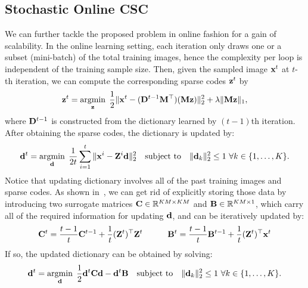 \subsection{Stochastic Online CSC}
We can further tackle the proposed problem in online fashion for a gain of scalability. In the online learning setting, each iteration only draws one or a subset (mini-batch) of the total training images, hence the complexity per loop is independent of the training sample size. Then, given the sampled image $\signal^t$ at $t$-th iteration, we can compute the corresponding sparse codes $\code^t$ by
\begin{equation} \label{eq:updatingCodeOnline}
    \code^t = \minimize{\code} \frac{1}{2}\|\signal^t - (\Filter^{t-1} \mask^\top)(\mask \code) \|_2^2 + \lambda \|\mask \code\|_1,
\end{equation}
where $\Filter^{t-1}$ is constructed from the dictionary learned by $(t-1)$th iteration. After obtaining the sparse codes, the dictionary is updated by:
\begin{equation}
    \filter^t = \minimize{\filter} \frac{1}{2t}\sum_{i=1}^{t} \|\signal^i - \Code^i \filter \|_2^2 \quad \text{subject to} \quad \|\filter_k\|^2_2 \leq 1 ~ \forall k \in \{1,\dots,K\}.
\end{equation}
Notice that updating dictionary involves all of the past training images and sparse codes. As shown in~\cite{mairal2009online,mairal2010online}, we can get rid of explicitly storing those data by introducing two surrogate matrices $\surC \in \mathbb{R}^{KM \times KM}$ and $\surB \in \mathbb{R}^{KM \times 1}$, which carry all of the required information for updating $\filter$, and can be iteratively updated by:
\begin{equation} \label{eq:updateSur}
    \surC^t  = \frac{t-1}{t} \surC^{t-1} + \frac{1}{t}(\Code^t)^\top \Code^t ~~~~~~~~~ \surB^t  = \frac{t-1}{t} \surB^{t-1} + \frac{1}{t}(\Code^t)^\top \signal^t
\end{equation}
If so, the updated dictionary can be obtained by solving:
\begin{equation} \label{eq:updatingFilterOnline}
    \filter^t = \minimize{\filter} \frac{1}{2} \filter^t \surC\filter - \filter^t\surB \quad \text{subject to} \quad \|\filter_k\|_2^2 \leq 1 ~ \forall k \in \{1,\dots,K\}.
\end{equation}


